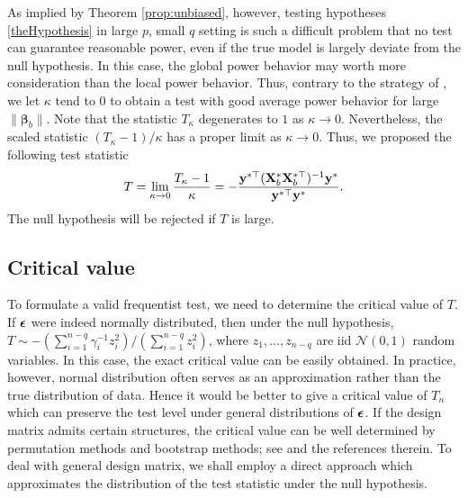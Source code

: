 \documentclass[smallextended]{svjour3}       %
\newcommand{\By}{\mathbf{y}}    \newcommand{\Bz}{\mathbf{z}}
\newcommand{\bfsym}[1]{\ensuremath{\boldsymbol{#1}}}
\def\bbeta{\bfsym \beta}
\begin{document}
As implied by Theorem \ref{prop:unbiased}, however, testing hypotheses \eqref{theHypothesis} in large $p$, small $q$ setting is such a difficult problem that no test can guarantee reasonable power, even if the true model is largely deviate from the null hypothesis.
In this case, the global power behavior may worth more consideration than the local power behavior.
Thus, contrary to the strategy of \cite{Goeman2006}, we let $\kappa$ tend to $0$ to obtain a test with good average power behavior for large $\|\bbeta_b\|$.
Note that the statistic $ T_{\kappa}$ degenerates to $1$ as $\kappa\to 0$.
Nevertheless, the scaled statistic $(T_{\kappa}-1)/\kappa$ has a proper limit as $\kappa\to 0$.
Thus, we proposed the following test statistic
\begin{equation*}
    T
    =
    \lim_{\kappa\to 0} \frac{T_{\kappa}-1}{\kappa}
    =
    -
     \frac{\By^{*\top} ( \BX_b^* \BX_b^{*\top} )^{-1} \By^* }{\By^{*\top} \By^*} .
\end{equation*}
The null hypothesis will be rejected if $T$ is large.




\subsection{Critical value}
To formulate a valid frequentist test, we need to determine the critical value of $T$.
If $\bepsilon$ were indeed normally distributed, then under the null hypothesis,
    $T \sim
    -
    {(\sum_{i=1}^{n-q} \gamma_i^{-1} z_i^2)}/{(\sum_{i=1}^{n-q} z_i^2)}$,
where $z_1,\ldots, z_{n-q}$ are iid $\mathcal N(0,1)$ random variables.
In this case, the exact critical value can be easily obtained.
In practice, however, normal distribution often serves as an approximation rather than the true distribution of data.
Hence it would be better to give a critical value of $T_{n}$ which can preserve the test level under general distributions of $\bepsilon$.
If the design matrix admits certain structures, the critical value can be well determined by permutation methods and bootstrap methods; see \cite{Arboretti,Baltagi} and the references therein.
To deal with general design matrix, we shall employ a direct approach which approximates the distribution of the test statistic under the null hypothesis.
\end{document}
